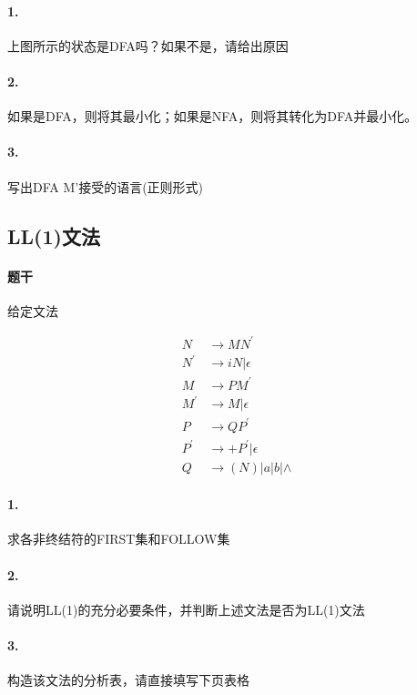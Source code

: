 \documentclass[UTF8]{ctexart} %
\begin{document}
\paragraph{1.} 上图所示的状态是DFA吗？如果不是，请给出原因

\paragraph{2.} 如果是DFA，则将其最小化；如果是NFA，则将其转化为DFA并最小化。

\paragraph{3.} 写出DFA M'接受的语言(正则形式)

\subsection{LL(1)文法}

\paragraph{题干} 给定文法

\begin{equation}
    \begin{aligned}
        N     & \rightarrow MN^{'}          \\
        N^{'} & \rightarrow iN|\epsilon     \\
        M     & \rightarrow PM^{'}          \\
        M^{'} & \rightarrow M|\epsilon      \\
        P     & \rightarrow QP^{'}          \\
        P^{'} & \rightarrow +P^{'}|\epsilon \\
        Q     & \rightarrow (N)|a|b|\wedge
    \end{aligned}
\end{equation}

\paragraph{1.} 求各非终结符的FIRST集和FOLLOW集

\paragraph{2.} 请说明LL(1)的充分必要条件，并判断上述文法是否为LL(1)文法

\paragraph{3.} 构造该文法的分析表，请直接填写下页表格
\end{document}
